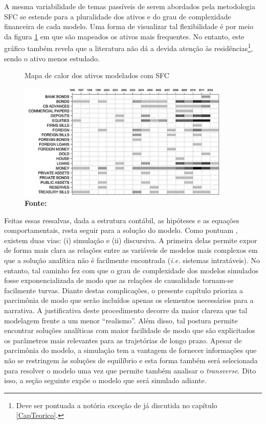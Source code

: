 A mesma variabilidade de temas passíveis de serem abordados pela metodologia SFC se estende para a pluralidade dos ativos e do grau de complexidade financeira de cada modelo. Uma forma de visualizar tal flexibilidade é por meio da figura \ref{Heatmap} em que são mapeados os ativos mais frequentes. No entanto, este gráfico também revela que a literatura não dá a devida atenção às residências\footnote{Deve ser pontuada a notória exceção de \textcite{zezza_u.s._2008} já discutida no capítulo \ref{CapTeorico}.}, sendo o ativo menos estudado. 


\begin{figure}[H]
	\centering
	\caption{Mapa de calor dos ativos modelados com SFC}
	\label{Heatmap}
	\includegraphics[width = 0.9\textwidth]{Modelo/Caverzassi_Heatmap.png}
	\caption*{\textbf{Fonte:} \textcite[p.~4]{caverzasi_stock-flow_2013}}
\end{figure}






Feitas essas ressalvas, dada a estrutura contábil, as hipóteses e as equações comportamentais, resta seguir para a solução do modelo. Como pontuam \textcite{caverzasi_stock-flow_2013}, existem duas vias: (i) simulação e (ii) discursiva. A primeira delas permite expor de forma mais clara as relações entre as variáveis de modelos mais complexos em que a solução analítica não é facilmente encontrada (\textit{i.e.} sistemas intratáveis). No entanto, tal caminho fez com que o grau de complexidade dos modelos simulados fosse exponencializada de modo que as relações de causalidade tornam-se facilmente turvas. Diante destas complicações, o presente capítulo prioriza a parcimônia de modo que serão incluídos apenas os elementos necessários para a narrativa. A justificativa deste procedimento decorre da maior clareza que tal modelagem frente a um menor ``realismo''.
Além disso, tal postura permite encontrar soluções analíticas com maior facilidade de modo que são explicitados os parâmetros mais relevantes para as trajetórias de longo prazo. Apesar de parcimônia do modelo, a simulação tem a vantagem
de fornecer informações que não se restringem às soluções de equilíbrio e esta forma
também será selecionada para resolver o modelo uma vez que permite também analisar o \textit{transverse}.
Dito isso, a seção seguinte expõe o modelo que será simulado adiante.
